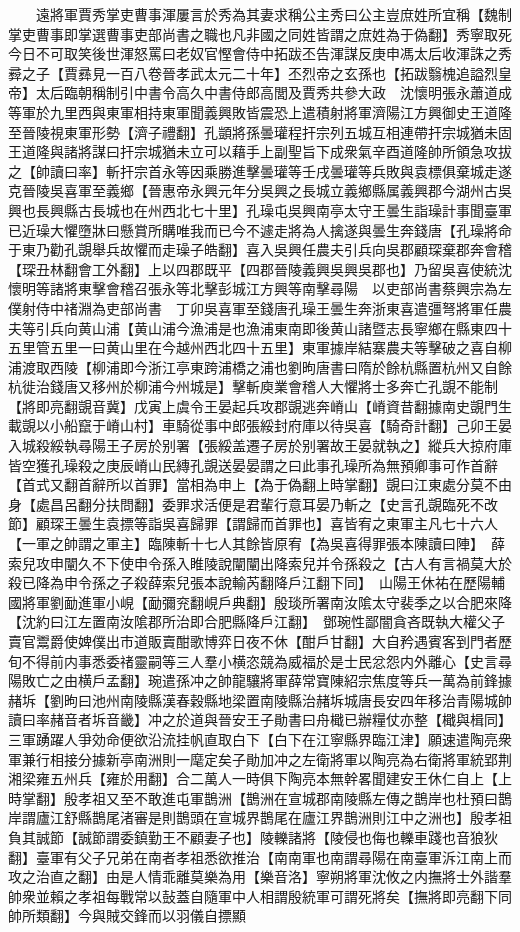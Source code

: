 　　遠將軍賈秀掌吏曹事渾屢言於秀為其妻求稱公主秀曰公主豈庶姓所宜稱【魏制掌吏曹事即掌選曹事吏部尚書之職也凡非國之同姓皆謂之庶姓為于偽翻】秀寧取死今日不可取笑後世渾怒罵曰老奴官慳會侍中拓跋丕告渾謀反庚申馮太后收渾誅之秀彛之子【賈彞見一百八卷晉孝武太元二十年】丕烈帝之玄孫也【拓跋翳槐追謚烈皇帝】太后臨朝稱制引中書令高久中書侍郎高閭及賈秀共參大政　沈懷明張永蕭道成等軍於九里西與東軍相持東軍聞義興敗皆震恐上遣積射將軍濟陽江方興御史王道隆至晉陵視東軍形勢【濟子禮翻】孔顗將孫曇瓘程扞宗列五城互相連帶扞宗城猶未固王道隆與諸將謀曰扞宗城猶未立可以藉手上副聖旨下成衆氣辛酉道隆帥所領急攻拔之【帥讀曰率】斬扞宗首永等因乘勝進擊曇瓘等壬戌曇瓘等兵敗與袁標俱棄城走遂克晉陵吳喜軍至義鄉【晉惠帝永興元年分吳興之長城立義鄉縣属義興郡今湖州古吳興也長興縣古長城也在州西北七十里】孔璪屯吳興南亭太守王曇生詣璪計事聞臺軍已近璪大懼墮牀曰懸賞所購唯我而已今不遽走將為人擒遂與曇生奔錢唐【孔璪將命于東乃勸孔覬舉兵故懼而走璪子皓翻】喜入吳興任農夫引兵向吳郡顧琛棄郡奔會稽【琛丑林翻會工外翻】上以四郡既平【四郡晉陵義興吳興吳郡也】乃留吳喜使統沈懷明等諸將東擊會稽召張永等北擊彭城江方興等南擊尋陽　以吏部尚書蔡興宗為左僕射侍中禇淵為吏部尚書　丁卯吳喜軍至錢唐孔璪王曇生奔浙東喜遣彊弩將軍任農夫等引兵向黄山浦【黄山浦今漁浦是也漁浦東南即後黄山諸暨志長寧鄉在縣東四十五里管五里一曰黄山里在今越州西北四十五里】東軍據岸結寨農夫等擊破之喜自柳浦渡取西陵【柳浦即今浙江亭東跨浦橋之浦也劉昫唐書曰隋於餘杭縣置杭州又自餘杭徙治錢唐又移州於柳浦今州城是】擊斬庾業會稽人大懼將士多奔亡孔覬不能制【將即亮翻覬音冀】戊寅上虞令王晏起兵攻郡覬逃奔嵴山【嵴資昔翻據南史覬門生載覬以小船竄于嵴山村】車騎從事中郎張綏封府庫以待吳喜【騎奇計翻】己卯王晏入城殺綏執尋陽王子房於别署【張綏盖遷子房於别署故王晏就執之】縱兵大掠府庫皆空獲孔璪殺之庚辰嵴山民縳孔覬送晏晏謂之曰此事孔璪所為無預卿事可作首辭【首式又翻首辭所以首罪】當相為申上【為于偽翻上時掌翻】覬曰江東處分莫不由身【處昌呂翻分扶問翻】委罪求活便是君輩行意耳晏乃斬之【史言孔覬臨死不改節】顧琛王曇生袁摽等詣吳喜歸罪【謂歸而首罪也】喜皆宥之東軍主凡七十六人【一軍之帥謂之軍主】臨陳斬十七人其餘皆原宥【為吳喜得罪張本陳讀曰陣】　薛索兒攻申闡久不下使申令孫入睢陵說闡闡出降索兒并令孫殺之【古人有言禍莫大於殺已降為申令孫之子殺薛索兒張本說輸芮翻降戶江翻下同】　山陽王休祐在歷陽輔國將軍劉勔進軍小峴【勔彌兖翻峴戶典翻】殷琰所署南汝隂太守裴季之以合肥來降【沈約曰江左置南汝隂郡所治即合肥縣降戶江翻】　鄧琬性鄙闇貪吝既執大權父子賣官鬻爵使婢僕出市道販賣酣歌博弈日夜不休【酣戶甘翻】大自矜遇賓客到門者歷旬不得前内事悉委禇靈嗣等三人羣小横恣競為威福於是士民忿怨内外離心【史言尋陽敗亡之由横戶孟翻】琬遣孫冲之帥龍驤將軍薛常寶陳紹宗焦度等兵一萬為前鋒據赭坼【劉昫曰池州南陵縣漢春穀縣地梁置南陵縣治赭坼城唐長安四年移治青陽城帥讀曰率赭音者坼音畿】冲之於道與晉安王子勛書曰舟檝已辦糧仗亦整【檝與楫同】三軍踴躍人爭効命便欲沿流挂帆直取白下【白下在江寧縣界臨江津】願速遣陶亮衆軍兼行相接分據新亭南洲則一麾定矣子勛加冲之左衛將軍以陶亮為右衛將軍統郢荆湘梁雍五州兵【雍於用翻】合二萬人一時俱下陶亮本無幹畧聞建安王休仁自上【上時掌翻】殷孝祖又至不敢進屯軍鵲洲【鵲洲在宣城郡南陵縣左傳之鵲岸也杜預曰鵲岸謂廬江舒縣鵲尾渚審是則鵲頭在宣城界鵲尾在廬江界鵲洲則江中之洲也】殷孝祖負其誠節【誠節謂委鎮勤王不顧妻子也】陵轢諸將【陵侵也侮也轢車踐也音狼狄翻】臺軍有父子兄弟在南者孝祖悉欲推治【南南軍也南謂尋陽在南臺軍泝江南上而攻之治直之翻】由是人情乖離莫樂為用【樂音洛】寧朔將軍沈攸之内撫將士外諧羣帥衆並賴之孝祖每戰常以鼔蓋自隨軍中人相謂殷統軍可謂死將矣【撫將即亮翻下同帥所類翻】今與賊交鋒而以羽儀自摽顯